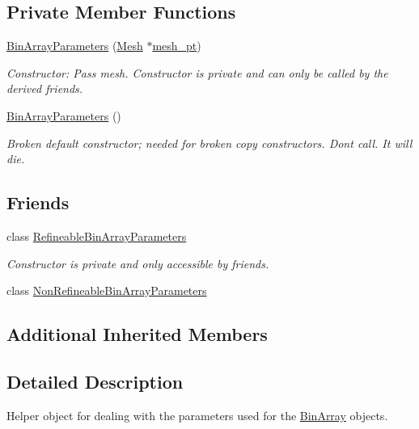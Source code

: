 \subsection*{Private Member Functions}
\begin{DoxyCompactItemize}
\item 
\hyperlink{classoomph_1_1BinArrayParameters_ae2bfef88dd9025fc731b11a7dd8fcb1b}{Bin\+Array\+Parameters} (\hyperlink{classoomph_1_1Mesh}{Mesh} $\ast$\hyperlink{classoomph_1_1SamplePointContainerParameters_a92bcab955d47e99d47b601253da7b6b2}{mesh\+\_\+pt})
\begin{DoxyCompactList}\small\item\em Constructor\+: Pass mesh. Constructor is private and can only be called by the derived friends. \end{DoxyCompactList}\item 
\hyperlink{classoomph_1_1BinArrayParameters_a25db158eff522cb0ad014eecbfa0d106}{Bin\+Array\+Parameters} ()
\begin{DoxyCompactList}\small\item\em Broken default constructor; needed for broken copy constructors. Don\textquotesingle{}t call. It will die. \end{DoxyCompactList}\end{DoxyCompactItemize}
\subsection*{Friends}
\begin{DoxyCompactItemize}
\item 
class \hyperlink{classoomph_1_1BinArrayParameters_a8e6251aa45b1fe0683105714f4d1721a}{Refineable\+Bin\+Array\+Parameters}
\begin{DoxyCompactList}\small\item\em Constructor is private and only accessible by friends. \end{DoxyCompactList}\item 
class \hyperlink{classoomph_1_1BinArrayParameters_a63762b7198d7c1a8df01b39c74ba2ad9}{Non\+Refineable\+Bin\+Array\+Parameters}
\end{DoxyCompactItemize}
\subsection*{Additional Inherited Members}


\subsection{Detailed Description}
Helper object for dealing with the parameters used for the \hyperlink{classBinArray}{Bin\+Array} objects. 

